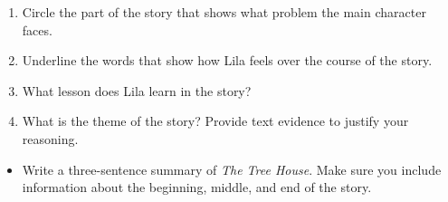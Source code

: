 \documentclass[12pt]{article}
\begin{document}
\begin{tcolorbox}[colframe=black!60, colback=white, 
coltitle=black, colbacktitle=black!15, fonttitle=\bfseries\Large, 
title=Independent Practice, halign title=center, left=10pt, right=10pt, top=10pt, bottom=15pt]

\begin{enumerate}[itemsep=1em]
    \item Circle the part of the story that shows what problem the main character faces.
    \item Underline the words that show how Lila feels over the course of the story.
    \item What lesson does Lila learn in the story? 
    \vspace{3cm}
    \item What is the theme of the story? Provide text evidence to justify your reasoning.
      \vspace{3cm}
\end{enumerate}
\end{tcolorbox}
  \vspace{1em}
\begin{tcolorbox}[colframe=black!60, colback=white, 
coltitle=black, colbacktitle=black!15, fonttitle=\bfseries\Large, 
title=Exit Ticket, halign title=center, left=10pt, right=10pt, top=10pt, bottom=15pt]
\textbf{}
\begin{itemize}
    \item Write a three-sentence summary of \textit{The Tree House}. Make sure you include information about the beginning, middle, and end of the story.
      \vspace{5cm}
\end{itemize}
\end{tcolorbox}
\end{document}
